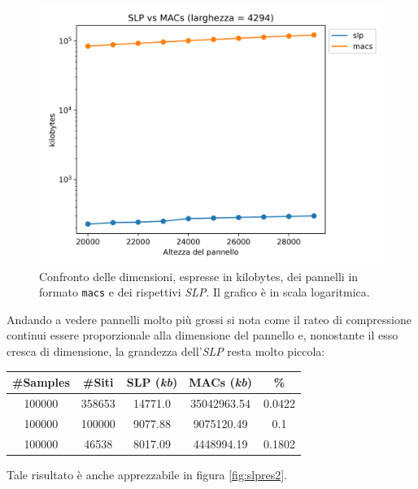 \begin{figure}
  \centering
  \includegraphics[scale = 0.6]{img/slp_vs_macs0.png}
  \caption{Confronto delle dimensioni, espresse in kilobytes, dei pannelli in
    formato \texttt{macs} e dei rispettivi \textit{SLP}. Il grafico è in scala
    logaritmica.}
  \label{fig:slpres1}
\end{figure}
Andando a vedere pannelli molto più grossi si nota come il rateo di
compressione continui essere proporzionale alla dimensione del pannello e,
nonostante il esso cresca di 
dimensione, la grandezza dell'\textit{SLP} resta molto piccola:
\begin{table}[H]
  \centering
  \begin{tabular}{c|c|c|c|c}
    \textbf{\#Samples} & \textbf{\#Siti} & \textbf{SLP (\textit{kb})}
    & \textbf{MACs (\textit{kb})} & \textbf{\%}\\
    \hline
    100000 & 358653 & 14771.0 & 35042963.54 & 0.0422\\
    100000 & 100000 & 9077.88 & 9075120.49 & 0.1\\
    100000 & 46538 & 8017.09 & 4448994.19 & 0.1802\\
  \end{tabular}
\end{table}
Tale risultato è anche apprezzabile in figura \ref{fig:slpres2}.
